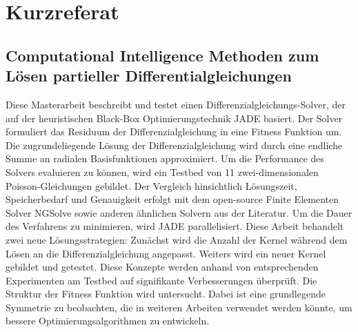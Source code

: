 \documentclass[./\jobname.tex]{subfiles}
\begin{document}
\setcounter{page}{2}
\chapter*{Kurzreferat}
\section*{Computational Intelligence Methoden zum Lösen partieller Differentialgleichungen}
%
Diese Masterarbeit beschreibt und testet einen Differenzialgleichungs-Solver, der auf der heuristischen Black-Box Optimierungstechnik JADE basiert. Der Solver formuliert das Residuum der Differenzialgleichung in eine Fitness Funktion um. Die zugrundeliegende Lösung der Differenzialgleichung wird durch eine endliche Summe an radialen Basisfunktionen approximiert. Um die Performance des Solvers evaluieren zu können, wird ein Testbed von 11 zwei-dimensionalen Poisson-Gleichungen gebildet. Der Vergleich hinsichtlich Lösungszeit, Speicherbedarf und Genauigkeit erfolgt mit dem open-source Finite Elementen Solver NGSolve sowie anderen ähnlichen Solvern aus der Literatur. Um die Dauer des Verfahrens zu minimieren, wird JADE parallelisiert. Diese Arbeit behandelt zwei neue Lösungsstrategien: Zunächst wird die Anzahl der Kernel während dem Lösen an die Differenzialgleichung angepasst. Weiters wird ein neuer Kernel gebildet und getestet. Diese Konzepte werden anhand von entsprechenden Experimenten am Testbed auf signifikante Verbesserungen überprüft. Die Struktur der Fitness Funktion wird untersucht. Dabei ist eine grundlegende Symmetrie zu beobachten, die in weiteren Arbeiten verwendet werden könnte, um bessere Optimierungsalgorithmen zu entwickeln. 
%
\end{document}
